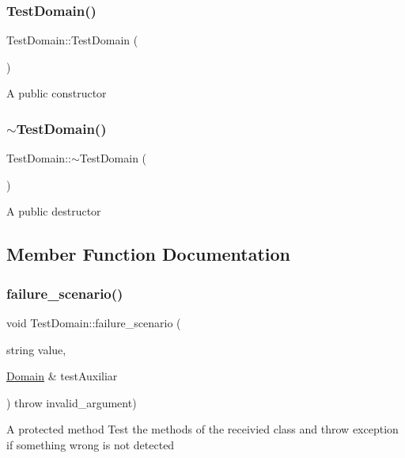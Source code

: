\subsubsection{\texorpdfstring{Test\+Domain()}{TestDomain()}}
{\footnotesize\ttfamily Test\+Domain\+::\+Test\+Domain (\begin{DoxyParamCaption}{ }\end{DoxyParamCaption})}

A public constructor \mbox{\label{class_test_domain_ab5be880050c36e6dcc470a452b4b9f69}} 
\subsubsection{\texorpdfstring{$\sim$\+Test\+Domain()}{~TestDomain()}}
{\footnotesize\ttfamily Test\+Domain\+::$\sim$\+Test\+Domain (\begin{DoxyParamCaption}{ }\end{DoxyParamCaption})}

A public destructor 

\subsection{Member Function Documentation}
\mbox{\label{class_test_domain_a026682e48bdb2ffdf6b3d353c7f055fe}} 
\subsubsection{\texorpdfstring{failure\+\_\+scenario()}{failure\_scenario()}}
{\footnotesize\ttfamily void Test\+Domain\+::failure\+\_\+scenario (\begin{DoxyParamCaption}\item[{string}]{value,  }\item[{\hyperlink{class_domain}{Domain} \&}]{test\+Auxiliar }\end{DoxyParamCaption}) throw  invalid\+\_\+argument) \hspace{0.3cm}{\ttfamily [protected]}}

A protected method Test the methods of the receivied class and throw exception if something wrong is not detected \mbox{\label{class_test_domain_a9945e79f1f6d965e6b58f149b2c8cf84}} 
